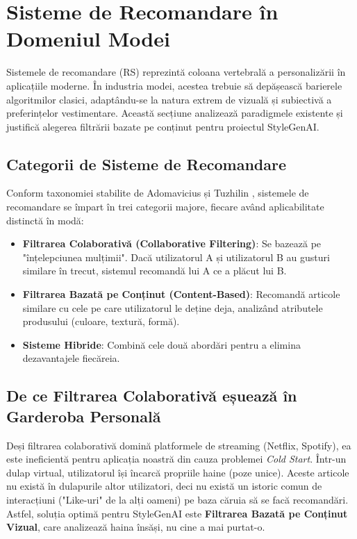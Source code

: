 \section{Sisteme de Recomandare în Domeniul Modei}
Sistemele de recomandare (RS) reprezintă coloana vertebrală a personalizării în aplicațiile moderne. În industria modei, acestea trebuie să depășească barierele algoritmilor clasici, adaptându-se la natura extrem de vizuală și subiectivă a preferințelor vestimentare. Această secțiune analizează paradigmele existente și justifică alegerea filtrării bazate pe conținut pentru proiectul StyleGenAI.

\subsection{Categorii de Sisteme de Recomandare}
Conform taxonomiei stabilite de Adomavicius și Tuzhilin \cite{adomavicius2005toward}, sistemele de recomandare se împart în trei categorii majore, fiecare având aplicabilitate distinctă în modă:

\begin{itemize}
    \item \textbf{Filtrarea Colaborativă (Collaborative Filtering)}: Se bazează pe "înțelepciunea mulțimii". Dacă utilizatorul A și utilizatorul B au gusturi similare în trecut, sistemul recomandă lui A ce a plăcut lui B.
    \item \textbf{Filtrarea Bazată pe Conținut (Content-Based)}: Recomandă articole similare cu cele pe care utilizatorul le deține deja, analizând atributele produsului (culoare, textură, formă).
    \item \textbf{Sisteme Hibride}: Combină cele două abordări pentru a elimina dezavantajele fiecăreia.
\end{itemize}

\subsection{De ce Filtrarea Colaborativă eșuează în Garderoba Personală}
Deși filtrarea colaborativă domină platformele de streaming (Netflix, Spotify), ea este ineficientă pentru aplicația noastră din cauza problemei \textit{Cold Start}.
Într-un dulap virtual, utilizatorul își încarcă propriile haine (poze unice). Aceste articole nu există în dulapurile altor utilizatori, deci nu există un istoric comun de interacțiuni ("Like-uri" de la alți oameni) pe baza căruia să se facă recomandări. 
Astfel, soluția optimă pentru StyleGenAI este \textbf{Filtrarea Bazată pe Conținut Vizual}, care analizează haina însăși, nu cine a mai purtat-o.

